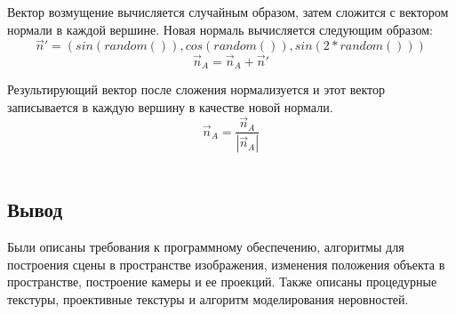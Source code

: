 Вектор возмущение вычисляется случайным образом, затем сложится с вектором нормали в каждой вершине.
Новая нормаль вычисляется следующим образом:
\begin{equation}
	\overrightarrow n' = (sin(random()), cos(random()), sin(2 * random()))
\end{equation}
\begin{equation}
	\overrightarrow n_A= \overrightarrow n_A + \overrightarrow n'
\end{equation}

Результирующий вектор после сложения нормализуется и этот вектор записывается в каждую вершину в качестве новой нормали.
\begin{equation}
	\overrightarrow n_A = \frac{\overrightarrow n_A}{|\overrightarrow n_A|}
\end{equation}
$ $
\subsection*{Вывод}
Были описаны требования к программному обеспечению, алгоритмы для построения сцены в пространстве изображения, изменения положения объекта в пространстве, построение камеры и ее проекций. Также описаны процедурные текстуры, проективные текстуры и алгоритм моделирования неровностей.
